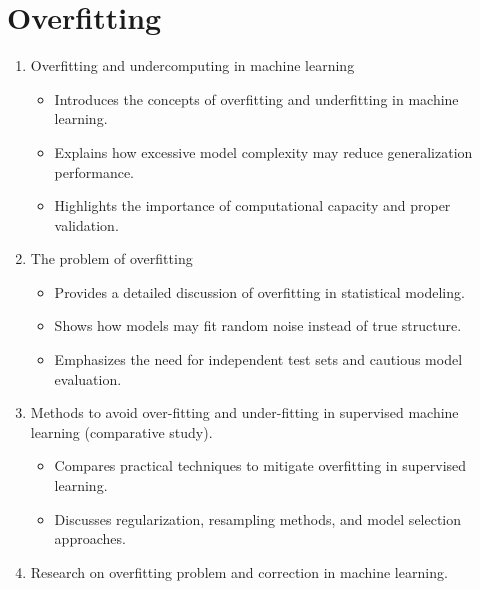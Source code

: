 \section{Overfitting}
    \begin{enumerate}
    
        \item Overfitting and undercomputing in machine learning
        \cite {dietterich1995overfitting}

        \begin{itemize}
        \item Introduces the concepts of overfitting and underfitting in machine learning.
        \item Explains how excessive model complexity may reduce generalization performance.
        \item Highlights the importance of computational capacity and proper validation.
        \end{itemize}
        
        \item The problem of overfitting
        \cite {hawkins2004problem}

        \begin{itemize}
        \item Provides a detailed discussion of overfitting in statistical modeling.
        \item Shows how models may fit random noise instead of true structure.
        \item Emphasizes the need for independent test sets and cautious model evaluation.
        \end{itemize}
        
        \item Methods to avoid over-fitting and under-fitting in supervised machine learning (comparative study).
        \cite {jabbar2015methods}

        \begin{itemize}
        \item Compares practical techniques to mitigate overfitting in supervised learning.
        \item Discusses regularization, resampling methods, and model selection approaches.
        \end{itemize}
        
        \item Research on overfitting problem and correction in machine learning.
        \cite {bu2020research}


\end{enumerate}
